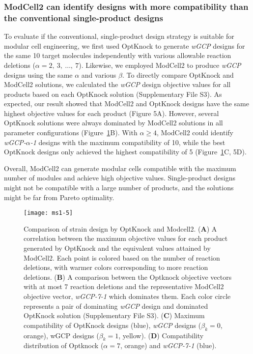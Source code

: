 \subsubsection{ModCell2 can identify designs with more compatibility than
the conventional single-product designs}
To evaluate if the
conventional, single-product design strategy is suitable for modular
cell engineering, we first used OptKnock to generate \emph{wGCP} designs
for the same 10 target molecules independently with various allowable
reaction deletions (\(\alpha = 2,\ 3,\ \ldots,\ 7\)). Likewise, we
employed ModCell2 to produce \emph{wGCP} designs using the same
\(\alpha\) and various \(\beta\). To directly compare OptKnock and
ModCell2 solutions, we calculated the \emph{wGCP} design objective
values for all products based on each OptKnock solution (Supplementary
File S3). As expected, our result showed that ModCell2 and OptKnock
designs have the same highest objective values for each product (Figure
5A). However, several OptKnock solutions were always dominated by
ModCell2 solutions in all parameter configurations (Figure~\ref{fig:ms1-fig5}B). With
\(\alpha \geq 4\), ModCell2 could identify
\emph{wGCP-}\(\alpha\)\emph{-1} designs with the maximum compatibility
of 10, while the best OptKnock designs only achieved the highest
compatibility of 5 (Figure~\ref{fig:ms1-fig5}C, 5D).

Overall, ModCell2 can generate modular cells compatible with the maximum number of modules and achieve high objective values.
Single-product designs might not be compatible with a large number of products, and the solutions might be far from Pareto optimality.

\begin{figure}[hbp]
  \centering
  \texttt{[image: ms1-5]}
    \caption[Comparison of strain design by OptKnock and Modcell2]{
Comparison of strain design by OptKnock and Modcell2.
(\textbf{A}) A correlation between the maximum objective values for each
product generated by OptKnock and the equivalent values attained by
ModCell2. Each point is colored based on the number of reaction
deletions, with warmer colors corresponding to more reaction deletions.
(\textbf{B}) A comparison between the Optknock objective vectors with at
most 7 reaction deletions and the representative ModCell2 objective
vector, \emph{wGCP-7-1} which dominates them. Each color circle
represents a pair of dominating \emph{wGCP} design and dominated
OptKnock solution (Supplementary File S3). (\textbf{C}) Maximum
compatibility of OptKnock designs (blue), \emph{wGCP} designs
    ($\beta_k=0$, orange), wGCP designs ($\beta_k = 1$,
yellow). (\textbf{D}) Compatibility distribution of Optknock ($\alpha = 7$,
orange) and \emph{wGCP-7-1} (blue).
    }
    \label{fig:ms1-fig5}
\end{figure}

